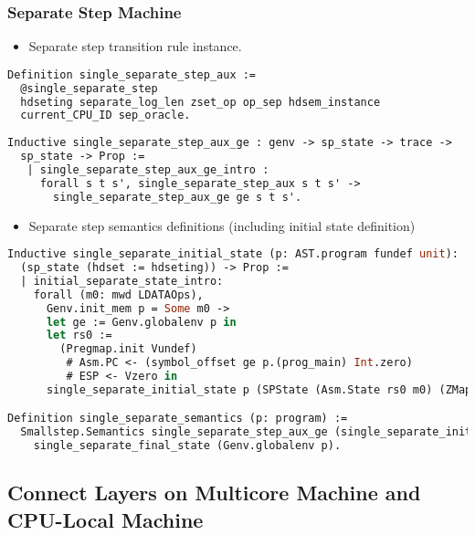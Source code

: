 \subsubsection{Separate Step Machine}
\begin{itemize}[leftmargin=*]
\item Separate step transition rule instance.
\end{itemize}
\begin{lstlisting}[language=Caml]
Definition single_separate_step_aux :=
  @single_separate_step
  hdseting separate_log_len zset_op op_sep hdsem_instance
  current_CPU_ID sep_oracle.
    
Inductive single_separate_step_aux_ge : genv -> sp_state -> trace -> 
  sp_state -> Prop :=
   | single_separate_step_aux_ge_intro : 
     forall s t s', single_separate_step_aux s t s' -> 
       single_separate_step_aux_ge ge s t s'.
\end{lstlisting}

\begin{itemize}[leftmargin=*]
\item Separate step semantics definitions (including initial state definition)
\end{itemize}
\begin{lstlisting}[language=Caml]
Inductive single_separate_initial_state (p: AST.program fundef unit): 
  (sp_state (hdset := hdseting)) -> Prop :=
  | initial_separate_state_intro: 
    forall (m0: mwd LDATAOps),
      Genv.init_mem p = Some m0 ->
      let ge := Genv.globalenv p in
      let rs0 :=
        (Pregmap.init Vundef)
         # Asm.PC <- (symbol_offset ge p.(prog_main) Int.zero)
         # ESP <- Vzero in
      single_separate_initial_state p (SPState (Asm.State rs0 m0) (ZMap.init nil)).

Definition single_separate_semantics (p: program) :=
  Smallstep.Semantics single_separate_step_aux_ge (single_separate_initial_state p) 
    single_separate_final_state (Genv.globalenv p).
\end{lstlisting}

\subsection{Connect Layers on Multicore Machine and CPU-Local Machine}
\label{chapter:certikos:subsec:connect-multicore}

